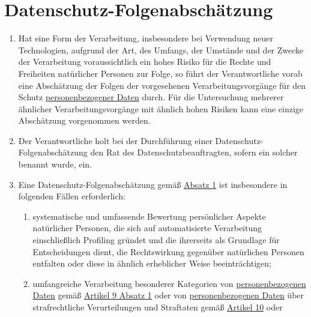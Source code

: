 \chapter{Datenschutz-Folgenabschätzung}
\label{ch:35}


\begin{enumerate}

  \item Hat eine Form der Verarbeitung, insbesondere bei Verwendung neuer Technologien, aufgrund der Art, des Umfangs,
   der Umstände und der Zwecke der Verarbeitung voraussichtlich ein hohes Risiko für die Rechte und Freiheiten
   natürlicher Personen zur Folge, so führt der Verantwortliche vorab eine Abschätzung der Folgen der vorgesehenen
   Verarbeitungsvorgänge für den Schutz \hyperref[itm:04-1]{personenbezogener Daten} durch. Für die Untersuchung mehrerer ähnlicher
   Verarbeitungsvorgänge mit ähnlich hohen Risiken kann eine einzige Abschätzung vorgenommen werden.
  \label{itm:35-1}

  \item Der Verantwortliche holt bei der Durchführung einer Datenschutz-Folgenabschätzung den Rat des
   Datenschutzbeauftragten, sofern ein solcher benannt wurde, ein.
  \label{itm:35-2}

  \item Eine Datenschutz-Folgenabschätzung gemäß \hyperref[itm:35-1]{Absatz 1} ist insbesondere in folgenden Fällen
   erforderlich:
  \label{itm:35-3}

  \begin{enumerate}
  
    \item systematische und umfassende Bewertung persönlicher Aspekte natürlicher Personen, die sich auf automatisierte
     Verarbeitung einschließlich Profiling gründet und die ihrerseits als Grundlage für Entscheidungen dient, die
     Rechtswirkung gegenüber natürlichen Personen entfalten oder diese in ähnlich erheblicher Weise beeinträchtigen;
    \label{itm:35-3a}

    \item umfangreiche Verarbeitung besonderer Kategorien von \hyperref[itm:04-1]{personenbezogenen Daten} gemäß \hyperref[itm:09-1]
     {Artikel 9 Absatz 1} oder von \hyperref[itm:04-1]{personenbezogenen Daten} über strafrechtliche Verurteilungen und Straftaten
     gemäß \hyperref[ch:10]{Artikel 10} oder
    \label{itm:35-3b}


\end{enumerate}
\end{enumerate}
